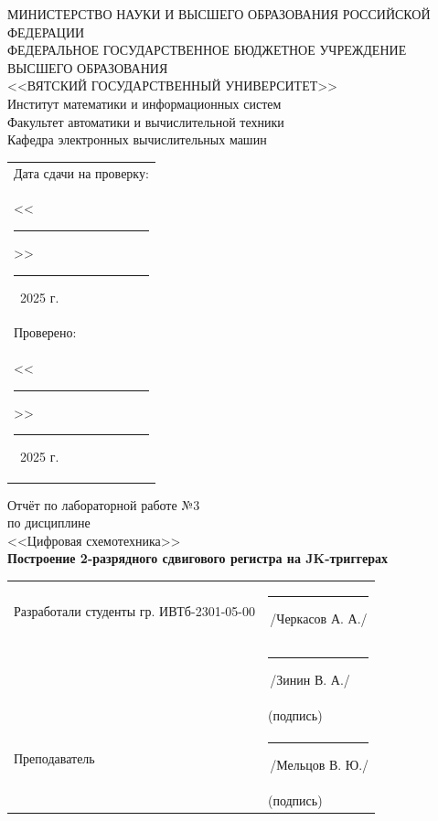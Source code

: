 \documentclass[oneside,a4paper,14pt]{extarticle}
\begin{document}
\newpage
\thispagestyle{empty}
\begin{center}
  МИНИСТЕРСТВО НАУКИ И ВЫСШЕГО ОБРАЗОВАНИЯ РОССИЙСКОЙ ФЕДЕРАЦИИ\\
  ФЕДЕРАЛЬНОЕ ГОСУДАРСТВЕННОЕ БЮДЖЕТНОЕ УЧРЕЖДЕНИЕ ВЫСШЕГО ОБРАЗОВАНИЯ\\
  <<ВЯТСКИЙ ГОСУДАРСТВЕННЫЙ УНИВЕРСИТЕТ>>\\
  Институт математики и информационных систем\\
  Факультет автоматики и вычислительной техники\\
  Кафедра электронных вычислительных машин
\end{center}
\vspace{10mm}

\hfill
\begin{tabular}{l}
  \footnotesize Дата сдачи на проверку:                                          \\
  \footnotesize <<\rule[-1mm]{5mm}{0.10mm}\/>>\rule[-1mm]{20mm}{0.10mm}\ 2025 г. \\
  \footnotesize Проверено:                                                       \\
  \footnotesize <<\rule[-1mm]{5mm}{0.10mm}\/>>\rule[-1mm]{20mm}{0.10mm}\ 2025 г. \\
\end{tabular}
\vfill

\begin{center}
  Отчёт по лабораторной работе №3\\
  по дисциплине\\
  <<Цифровая схемотехника>>\\
  \textbf{Построение 2-разрядного сдвигового регистра на JK-триггерах}\\
\end{center}
\vspace{25mm}
\noindent
\begin{tabular}{ll}
  Разработали студенты гр. ИВТб-2301-05-00 & \hspace{5mm}\rule[-1mm]{30mm}{0.10mm}\,/Черкасов А. А./ \\
                                           & \hspace{5mm}\rule[-1mm]{30mm}{0.10mm}\,/Зинин В. А./    \\
                                           & \hspace{12.5mm}\footnotesize(подпись)                   \\
  Преподаватель                           & \hspace{5mm}\rule[-1mm]{30mm}{0.10mm}\,/Мельцов В. Ю./  \\
                                           & \hspace{12.5mm}\footnotesize(подпись)                   \\
\end{tabular}
\end{document}
